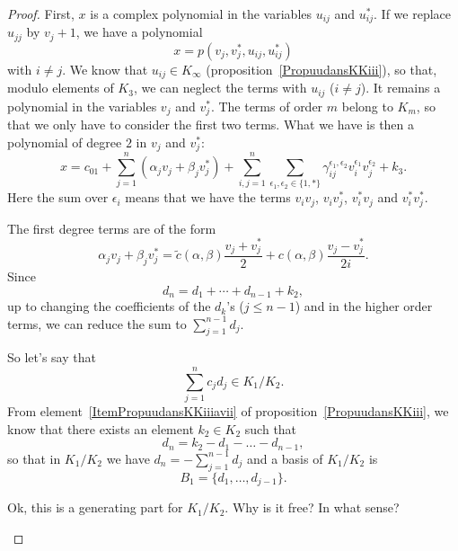 \begin{proof}
	First, $x$ is a complex polynomial in the variables $u_{ij}$ and $u_{ij}^*$. If we replace $u_{jj}$ by $v_j+1$, we have a polynomial
	\begin{equation}
		x=p(v_j,v_j^*,u_{ij},u_{ij}^*)
	\end{equation}
	with $i\neq j$. We know that $u_{ij}\in K_{\infty}$ (proposition~\ref{PropuudansKKiii}), so that, modulo elements of $K_3$, we can neglect the terms with $u_{ij}$ ($i\neq j$). It remains a polynomial in the variables $v_j$ and $v_j^*$. The terms of order $m$ belong to $K_m$, so that we only have to consider the first two terms. What we have is then a polynomial of degree $2$ in $v_j$ and $v_j^*$:
	\begin{equation}        \label{EqxSumvvdgammaUn}
		x=c_01+\sum_{j=1}^n(\alpha_jv_j+\beta_jv_j^*)+\sum_{i,j=1}^n\sum_{\epsilon_1,\epsilon_2\in\{ 1,* \}}\gamma_{ij}^{\epsilon_1,\epsilon_2}v_i^{\epsilon_1}v_j^{\epsilon_2}+k_3.
	\end{equation}
	Here the sum over $\epsilon_i$ means that we have the terms $v_iv_j$, $v_iv_j^*$, $v_i^*v_j$ and $v_i^*v_j^*$.

	The first degree terms are of the form
	\begin{equation}
		\alpha_j v_j+\beta_jv^*_j=\tilde c(\alpha,\beta)\frac{ v_j+v_j^* }{ 2 }+c(\alpha,\beta)\frac{ v_j-v_j^* }{ 2i }.
	\end{equation}
	Since
	\begin{equation}
		d_n=d_1+\cdots+d_{n-1}+k_2,
	\end{equation}
	up to changing the coefficients of the $d_k$'s ($j\leq n-1$) and in the higher order terms, we can reduce the sum to $\sum_{j=1}^{n-1}d_j$.


	So let's say that
	\begin{equation}
		\sum_{j=1}^n c_jd_j\in K_1/K_2.
	\end{equation}
	From element~\ref{ItemPropuudansKKiiiavii} of proposition~\ref{PropuudansKKiii}, we know that there exists an element $k_2\in K_2$ such that
	\begin{equation}
		d_n=k_2-d_1-\ldots -d_{n-1},
	\end{equation}
	so that in $K_1/K_2$ we have $d_n=-\sum_{j=1}^{n-1}d_j$ and a basis of $K_1/K_2$ is
	\begin{equation}
		B_1=\{ d_1,\ldots,d_{j-1} \}.
	\end{equation}
	\begin{probleme}
		Ok, this is a generating part for $K_1/K_2$. Why is it free? In what sense?
	\end{probleme}


\end{proof}
